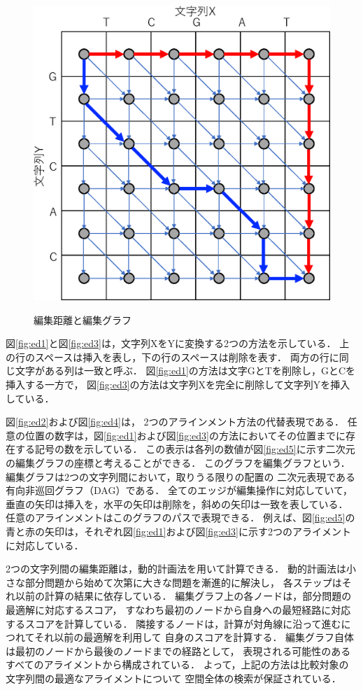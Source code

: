 \begin{figure}[t!]
\begin{center}
{\includegraphics[keepaspectratio, scale=0.5]{fig/2/ed5.eps}
\label{fig:ed5}
 }
\caption{編集距離と編集グラフ}
\label{fig:ed}
\end{center}
\end{figure}
図\ref{fig:ed1}と図\ref{fig:ed3}は，文字列XをYに変換する2つの方法を示している．
上の行のスペースは挿入を表し，下の行のスペースは削除を表す．
両方の行に同じ文字がある列は一致と呼ぶ．
図\ref{fig:ed1}の方法は文字GとTを削除し，GとCを挿入する一方で，
図\ref{fig:ed3}の方法は文字列Xを完全に削除して文字列Yを挿入している．

図\ref{fig:ed2}および図\ref{fig:ed4}は， 2つのアラインメント方法の代替表現である．
任意の位置の数字は，図\ref{fig:ed1}および図\ref{fig:ed3}の方法においてその位置までに存
在する記号の数を示している．
この表示は各列の数値が図\ref{fig:ed5}に示す二次元の編集グラフの座標と考えることができる．
このグラフを編集グラフという．
編集グラフは2つの文字列間において，取りうる限りの配置の
二次元表現である有向非巡回グラフ（DAG）である．
全てのエッジが編集操作に対応していて，垂直の矢印は挿入を，水平の矢印は削除を，斜めの矢印は一致を表している．
任意のアラインメントはこのグラフのパスで表現できる．
例えば、図\ref{fig:ed5}の青と赤の矢印は，それぞれ図\ref{fig:ed1}および図\ref{fig:ed3}に示す2つのアライメントに対応している．

2つの文字列間の編集距離は，動的計画法を用いて計算できる．
動的計画法は小さな部分問題から始めて次第に大きな問題を漸進的に解決し，
各ステップはそれ以前の計算の結果に依存している．
編集グラフ上の各ノードは，部分問題の最適解に対応するスコア，
すなわち最初のノードから自身への最短経路に対応するスコアを計算している．
隣接するノードは，計算が対角線に沿って進むにつれてそれ以前の最適解を利用して
自身のスコアを計算する．
編集グラフ自体は最初のノードから最後のノードまでの経路として，
表現される可能性のあるすべてのアライメントから構成されている．
よって，上記の方法は比較対象の文字列間の最適なアライメントについて
空間全体の検索が保証されている．

